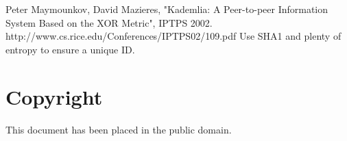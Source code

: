 \documentclass{article}
\begin{document}
\begin{thebibliography}{99}
Peter Maymounkov, David Mazieres, "Kademlia: A Peer-to-peer Information System Based on the XOR Metric", IPTPS 2002. http://www.cs.rice.edu/Conferences/IPTPS02/109.pdf
Use SHA1 and plenty of entropy to ensure a unique ID.
\end{thebibliography}

{\section {Copyright}}

This document has been placed in the public domain.
\end{document}
